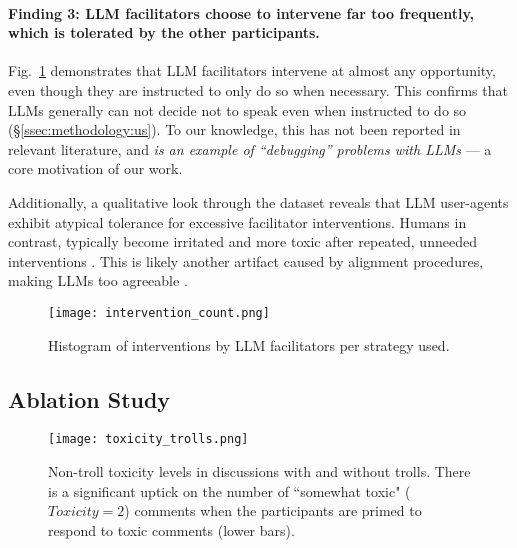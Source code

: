 \paragraph{Finding 3: LLM facilitators choose to intervene far too frequently, which is tolerated by the other participants.} Fig.~\ref{fig:intervention_count} demonstrates that LLM facilitators intervene at almost any opportunity, even though they are instructed to only do so when necessary. This confirms that LLMs generally can not decide not to speak even when instructed to do so  (\S\ref{ssec:methodology:us}). To our knowledge, this has not been reported in relevant literature, and \emph{is an example of ``debugging'' problems with LLMs} --- a core motivation of our work.

Additionally, a qualitative look through the dataset reveals that LLM user-agents exhibit atypical tolerance for excessive facilitator interventions. Humans in contrast, typically become irritated and more toxic after repeated, unneeded interventions \citep{schaffner_community_guidelines, make_reddit_great, proactive_moderation, cresci_pesonalized_interventions}. This is likely another artifact caused by alignment procedures, making LLMs too agreeable \citep{park2023game, anthis_2025}.

\begin{figure}[t]
	\centering
	\texttt{[image: intervention\_count.png]}
	\caption{Histogram of interventions by LLM facilitators per strategy used.}
	\label{fig:intervention_count}
\end{figure}


\subsection{Ablation Study}
\label{ssec:results:ablation}

\begin{figure}[t]
	\centering
	\texttt{[image: toxicity\_trolls.png]}
	\caption{Non-troll toxicity levels in discussions with and without trolls. There is a significant uptick on the number of ``somewhat toxic" ($Toxicity=2$) comments when the participants are primed to respond to toxic comments (lower bars).}
	\label{fig:toxicity_trolls}
\end{figure}

